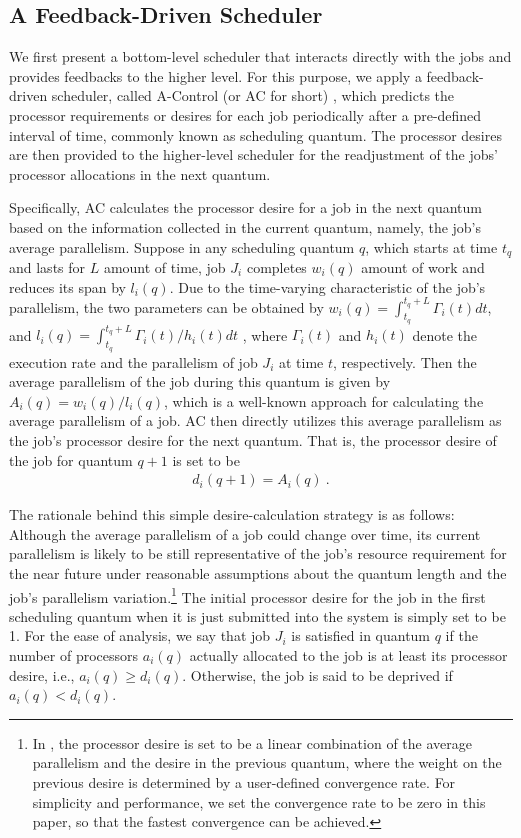 \documentclass[10pt, a4paper]{article}
\begin{document}
\subsection{A Feedback-Driven Scheduler}

We first present a bottom-level scheduler that interacts directly with the jobs and provides
feedbacks to the higher level. For this purpose, we apply a feedback-driven scheduler, called
A-Control (or AC for short) \cite{SunCaHs11,SunHs08}, which predicts the processor requirements or
desires for each job periodically after a pre-defined interval of time, commonly known as
scheduling quantum. The processor desires are then provided to the higher-level scheduler for the
readjustment of the jobs' processor allocations in the next quantum.

Specifically, AC calculates the processor desire for a job in the next quantum based on the
information collected in the current quantum, namely, the job's average parallelism. Suppose in any
scheduling quantum $q$, which starts at time $t_q$ and lasts for $L$ amount of time, job $J_i$
completes $w_i(q)$ amount of work and reduces its span by $l_i(q)$. Due to the time-varying
characteristic of the job's parallelism, the two parameters can be obtained by $w_i(q) =
\int_{t_q}^{t_q+L} \Gamma_i(t)dt$, and $l_i(q) = \int_{t_q}^{t_q + L} \Gamma_i(t)/h_i(t)dt$
\cite{SunCaHs11}, where $\Gamma_i(t)$ and $h_i(t)$ denote the execution rate and the parallelism of
job $J_i$ at time $t$, respectively. Then the average parallelism of the job during this quantum is
given by $A_i(q) = w_i(q)/l_i(q)$, which is a well-known approach for calculating the average
parallelism of a job. AC then directly utilizes this average parallelism as the job's processor
desire for the next quantum. That is, the processor desire of the job for quantum $q+1$ is set to
be
\begin{eqnarray}
d_i(q+1) = A_i(q) \ .
\end{eqnarray}

The rationale behind this simple desire-calculation strategy is as follows: Although the average
parallelism of a job could change over time, its current parallelism is likely to be still
representative of the job's resource requirement for the near future under reasonable assumptions
about the quantum length and the job's parallelism variation.\footnote{In \cite{SunCaHs11,SunHs08},
the processor desire is set to be a linear combination of the average parallelism and the desire in
the previous quantum, where the weight on the previous desire is determined by a user-defined
convergence rate. For simplicity and performance, we set the convergence rate to be zero in this
paper, so that the fastest convergence can be achieved.} The initial processor desire for the job
in the first scheduling quantum when it is just submitted into the system is simply set to be 1.
For the ease of analysis, we say that job $J_i$ is satisfied in quantum $q$ if the number of
processors $a_i(q)$ actually allocated to the job is at least its processor desire, i.e., $a_i(q)
\ge d_i(q)$. Otherwise, the job is said to be deprived if $a_i(q) < d_i(q)$.
\end{document}

